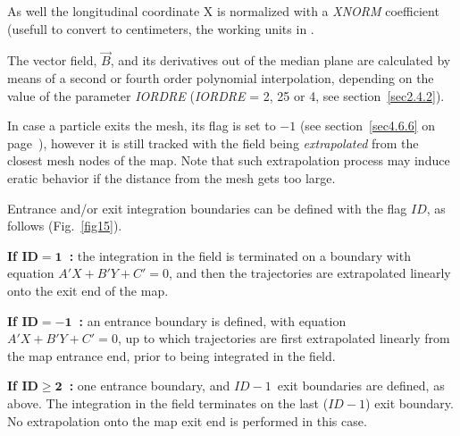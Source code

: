 \noindent As well the longitudinal coordinate  X is normalized with 
a  \textsl{XNORM} coefficient (usefull to convert to centimeters, the working units in  \zgoubi. 

\noindent The vector field, $ \vec  B $, and its derivatives out of the median
plane are calculated by means of a second or fourth order polynomial 
interpolation, depending on 
the value of the parameter \textsl{IORDRE} (\textsl{IORDRE} = 2, 25 or 4, 
see section~\ref{sec2.4.2}). 
\bigskip

\noindent In case a particle  exits the mesh, its \IEX{} flag is set to $-1$ (see section~\ref{sec4.6.6} on 
page~\pageref{sec4.6.6}), however it is still tracked with the field being {\it extrapolated} from 
the closest mesh nodes of the map. Note that such extrapolation process may induce eratic behavior if the distance from the mesh gets 
too large. 

\bigskip

\noindent Entrance and/or exit integration boundaries can be defined with 
the flag $ID$, as follows (Fig.~\ref{fig15}).
\bigskip

\noindent \textbf{If  $\mathbf{ID = 1}$~:} the integration in the field 
is terminated on a boundary with equation $A'X + B'Y + C'=0 $, and 
then the trajectories are extrapolated linearly onto the exit end of the 
map.
\medskip

\noindent \textbf{If  $\mathbf{ID = -1}$~:} an entrance boundary is 
defined, with equation $A'X + B'Y + C'=0 $, up to which  trajectories are 
first extrapolated linearly from the map entrance end, prior to being 
integrated in the field.
\medskip

\noindent \textbf{If  $\mathbf{ID \geq 2}$~:} one entrance boundary, and 
$ID-1$~exit boundaries are defined, as above. The integration in the 
field terminates on the last ($ID - 1$) exit boundary. No extrapolation onto 
the map exit end is performed in this case.

\newpage

